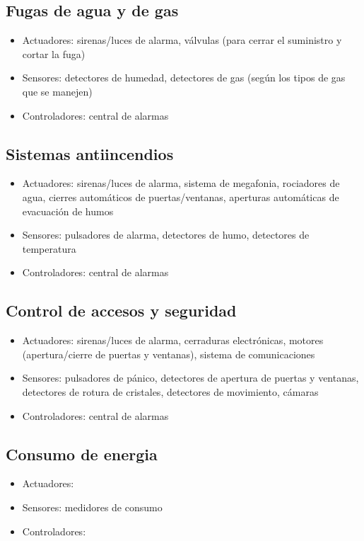 \documentclass[spanish,10pt,a4paper,final,oneside]{article}
\begin{document}
\subsection{Fugas de agua y de gas}
\begin{itemize}
\item Actuadores: sirenas/luces de alarma, válvulas (para cerrar el suministro y cortar la fuga)
\item Sensores: detectores de humedad, detectores de gas (según los tipos de gas que se manejen)
\item Controladores: central de alarmas
\end{itemize}

\subsection{Sistemas antiincendios}
\begin{itemize}
\item Actuadores: sirenas/luces de alarma, sistema de megafonia, rociadores de agua, cierres automáticos de puertas/ventanas, aperturas automáticas de evacuación de humos
\item Sensores: pulsadores de alarma, detectores de humo, detectores de temperatura
\item Controladores: central de alarmas
\end{itemize}

\subsection{Control de accesos y seguridad}
\begin{itemize}
\item Actuadores: sirenas/luces de alarma, cerraduras electrónicas, motores (apertura/cierre de puertas y ventanas), sistema de comunicaciones
\item Sensores: pulsadores de pánico, detectores de apertura de puertas y ventanas, detectores de rotura de cristales, detectores de movimiento, cámaras
\item Controladores: central de alarmas
\end{itemize}

\subsection{Consumo de energia}
\begin{itemize}
\item Actuadores:
\item Sensores: medidores de consumo
\item Controladores: 
\end{itemize}
\end{document}
